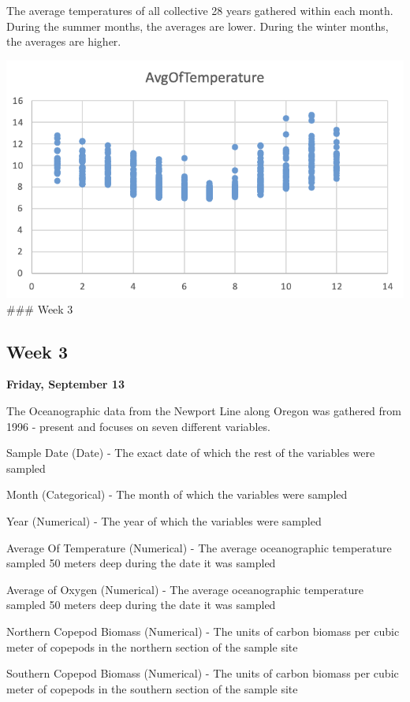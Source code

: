 \documentclass[
  letterpaper,
  DIV=11,
  numbers=noendperiod]{scrreprt}
\begin{document}
The average temperatures of all collective 28 years gathered within each
month. During the summer months, the averages are lower. During the
winter months, the averages are higher.

\includegraphics{TemperatureMonthAverage.png} \#\#\# Week 3

\subsection{Week 3}\label{week-3-1}

\textbf{Friday, September 13}

The Oceanographic data from the Newport Line along Oregon was gathered
from 1996 - present and focuses on seven different variables.

Sample Date (Date) - The exact date of which the rest of the variables
were sampled

Month (Categorical) - The month of which the variables were sampled

Year (Numerical) - The year of which the variables were sampled

Average Of Temperature (Numerical) - The average oceanographic
temperature sampled 50 meters deep during the date it was sampled

Average of Oxygen (Numerical) - The average oceanographic temperature
sampled 50 meters deep during the date it was sampled

Northern Copepod Biomass (Numerical) - The units of carbon biomass per
cubic meter of copepods in the northern section of the sample site

Southern Copepod Biomass (Numerical) - The units of carbon biomass per
cubic meter of copepods in the southern section of the sample site
\end{document}
